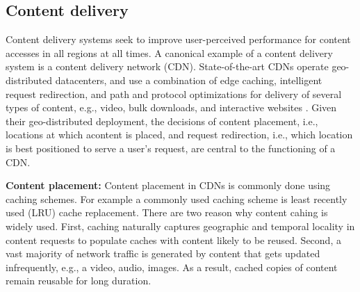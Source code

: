 
%
%
%


\subsection{Content delivery}
\label{sec:ch2-cdn}

Content delivery systems seek to improve user-perceived performance for content accesses in all regions  at all times. A canonical example of a content delivery system is a content delivery network (CDN). State-of-the-art CDNs operate geo-distributed datacenters, and use a combination of edge caching, intelligent request redirection, and path and protocol optimizations for delivery of several types of content, e.g., video, bulk downloads, and interactive websites \cite{DilleyMPPSW02,akamai-overview}. Given their geo-distributed deployment, the decisions of content placement, i.e., locations at which acontent is placed, and request redirection, i.e., which location is best positioned to serve a user's request, are central to the functioning of a CDN.

\textbf{Content placement:} Content placement in CDNs is commonly done using caching schemes. For example a commonly used caching scheme is least recently used (LRU) cache replacement. There are two reason why content cahing is widely used. First, caching naturally captures geographic and temporal locality in content requests to populate caches with content likely to be reused. Second, a vast majority of network traffic is generated by content that gets updated infrequently, e.g., a video, audio, images. As a result, cached copies of content remain reusable for long duration. 


